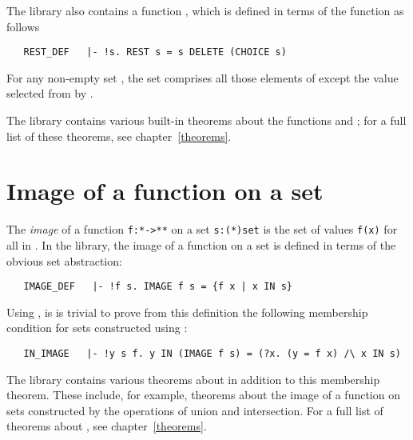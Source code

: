 The library also contains a function , which is defined in terms of
the  function as follows

\begin{hol}
\begin{verbatim}
   REST_DEF   |- !s. REST s = s DELETE (CHOICE s)
\end{verbatim}\end{hol}

\noindent For any non-empty set , the set  comprises all those
elements of  except the value selected from  by .

The library contains various built-in theorems about the functions 
and ; for a full list of these theorems, see chapter~\ref{theorems}.

\section{Image of a function on a set}

The {\it image\/} of a function {\small\verb!f:*->**!} on a set
{\small\verb!s:(*)set!} is the set of values {\small\verb!f(x)!} for all 
in .  In the  library, the image of a function on a set is
defined in terms of the obvious set abstraction:

\begin{hol}
\begin{verbatim}
   IMAGE_DEF   |- !f s. IMAGE f s = {f x | x IN s}
\end{verbatim}\end{hol}

\noindent Using , is is trivial to prove from this
definition the following membership condition for sets constructed using
:

\begin{hol}
\begin{verbatim}
   IN_IMAGE   |- !y s f. y IN (IMAGE f s) = (?x. (y = f x) /\ x IN s)
\end{verbatim}\end{hol}

\noindent The  library contains various theorems about  in
addition to this membership theorem.  These include, for example, theorems
about the image of a function on sets constructed by the operations of union
and intersection.  For a full list of theorems about , see
chapter~\ref{theorems}.

